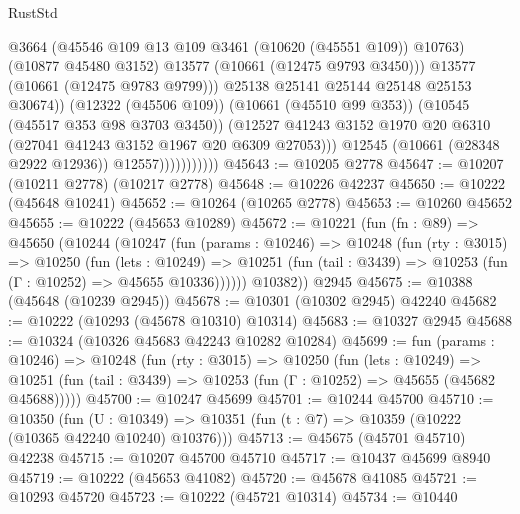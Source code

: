 \begin{lexlean}{RustStd}
\begin{coremodule}
                                    @3664
                                    (@45546 @109 @13 @109 @3461 (@10620 (@45551 @109)) @10763)
                                    (@10877 @45480 @3152)
                                    @13577
                                    (@10661 (@12475 @9793 @3450)))
                                  @13577
                                  (@10661 (@12475 @9783 @9799)))
                                @25138
                                @25141
                                @25144
                                @25148
                                @25153
                                @30674))
                            (@12322 (@45506 @109))
                            (@10661 (@45510 @99 @353))
                            (@10545 (@45517 @353 @98 @3703 @3450))
                            (@12527
                              @41243
                              @3152
                              @1970
                              @20
                              @6310
                              (@27041 @41243 @3152 @1967 @20 @6309 @27053)))
                          @12545
                          (@10661 (@28348 @2922 @12936))
                          @12557)))))))))))
@45643 := @10205 @2778
@45647 := @10207 (@10211 @2778) (@10217 @2778)
@45648 := @10226 @42237
@45650 := @10222 (@45648 @10241)
@45652 := @10264 (@10265 @2778)
@45653 := @10260 @45652
@45655 := @10222 (@45653 @10289)
@45672 := @10221
    (fun (fn : @89) =>
    @45650
      (@10244
        (@10247
          (fun (params : @10246) =>
          @10248
            (fun (rty : @3015) =>
            @10250
              (fun (lets : @10249) =>
              @10251 (fun (tail : @3439) => @10253 (fun (Γ : @10252) => @45655 @10336))))))
        @10382))
    @2945
@45675 := @10388 (@45648 (@10239 @2945))
@45678 := @10301 (@10302 @2945) @42240
@45682 := @10222 (@10293 (@45678 @10310) @10314)
@45683 := @10327 @2945
@45688 := @10324 (@10326 @45683 @42243 @10282 @10284)
@45699 := fun (params : @10246) =>
  @10248
    (fun (rty : @3015) =>
    @10250
      (fun (lets : @10249) =>
      @10251 (fun (tail : @3439) => @10253 (fun (Γ : @10252) => @45655 (@45682 @45688)))))
@45700 := @10247 @45699
@45701 := @10244 @45700
@45710 := @10350
    (fun (U : @10349) => @10351 (fun (t : @7) => @10359 (@10222 (@10365 @42240 @10240) @10376)))
@45713 := @45675 (@45701 @45710) @42238
@45715 := @10207 @45700 @45710
@45717 := @10437 @45699 @8940
@45719 := @10222 (@45653 @41082)
@45720 := @45678 @41085
@45721 := @10293 @45720
@45723 := @10222 (@45721 @10314)
@45734 := @10440

\end{coremodule}
\end{lexlean}
